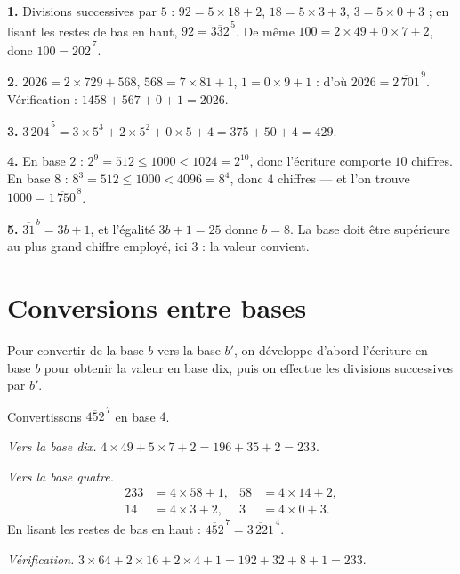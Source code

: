 \begin{corrige}
\textbf{1.} Divisions successives par $5$ : $92 = 5\times18+2$,
$18 = 5\times3+3$, $3 = 5\times0+3$ ; en lisant les restes de bas en haut,
$92 = \overline{332}^{\,5}$. De même $100 = 2\times49+0\times7+2$, donc
$100 = \overline{202}^{\,7}$.

\textbf{2.} $2026 = 2\times729+568$, $568 = 7\times81+1$, $1 = 0\times9+1$ :
d'où $2026 = \overline{2\,701}^{\,9}$. Vérification :
$1458+567+0+1 = 2026$.

\textbf{3.} $\overline{3\,204}^{\,5}
= 3\times5^{3}+2\times5^{2}+0\times5+4 = 375+50+4 = 429$.

\textbf{4.} En base $2$ : $2^{9} = 512 \leq 1000 < 1024 = 2^{10}$, donc
l'écriture comporte $10$ chiffres. En base $8$ : $8^{3} = 512 \leq 1000 <
4096 = 8^{4}$, donc $4$ chiffres — et l'on trouve
$1000 = \overline{1\,750}^{\,8}$.

\textbf{5.} $\overline{31}^{\,b} = 3b+1$, et l'égalité $3b+1 = 25$ donne
$b = 8$. La base doit être supérieure au plus grand chiffre employé, ici $3$ :
la valeur convient.
\end{corrige}

\section{Conversions entre bases}

\begin{propriete}
Pour convertir de la base $b$ vers la base $b'$, on développe d'abord
l'écriture en base $b$ pour obtenir la valeur en base dix, puis on effectue
les divisions successives par $b'$.
\end{propriete}

\begin{exemple}
Convertissons $\overline{452}^{\,7}$ en base $4$.

\emph{Vers la base dix.} $4\times49+5\times7+2 = 196+35+2 = 233$.

\emph{Vers la base quatre.}
\[
\begin{aligned}
  233 &= 4\times58+1, & 58 &= 4\times14+2, \\
  14  &= 4\times3+2,  & 3  &= 4\times0+3 .
\end{aligned}
\]
En lisant les restes de bas en haut : $\overline{452}^{\,7} =
\overline{3\,221}^{\,4}$.

\emph{Vérification.} $3\times64+2\times16+2\times4+1 = 192+32+8+1 = 233$.
\end{exemple}

